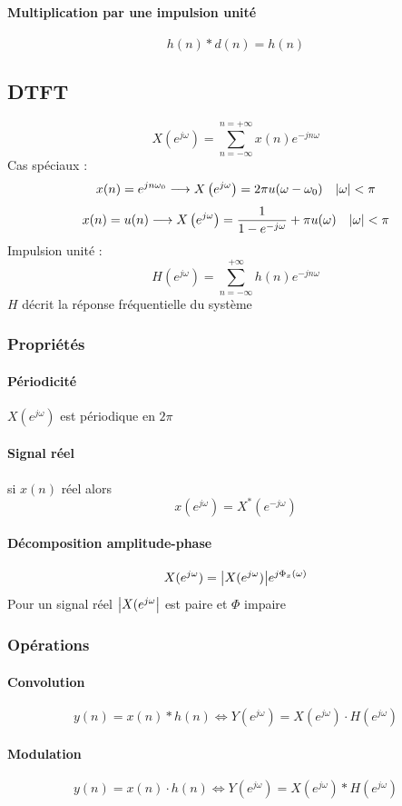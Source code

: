 \documentclass[resume]{subfiles}
\begin{document}
\paragraph{Multiplication par une impulsion unité}
$$h(n)*d(n)=h(n)$$
\subsection{DTFT}
$$\boxed{X\left(e^{j\omega}\right)=\sum_{n=-\infty}^{n=+\infty}x(n)e^{-jn\omega}}$$
Cas spéciaux :
$$x(n)=e^{jn\omega_0}\longrightarrow X\left(e^{j\omega}\right)=2\pi u(\omega-\omega_0)\quad \abs{\omega}<\pi$$
$$x(n)=u(n)\longrightarrow X\left(e^{j\omega}\right)=\frac{1}{1-e^{-j\omega}}+\pi u(\omega)\quad \abs{\omega}<\pi$$
Impulsion unité :
$$H(e^{j\omega})=\sum_{n=-\infty}^{+\infty}h(n)e^{-jn\omega}$$
$H$ décrit la réponse fréquentielle du système
\subsubsection{Propriétés}
\paragraph{Périodicité} $X(e^{j\omega})$ est périodique en $2\pi$
\paragraph{Signal réel} si $x(n)$ réel alors
$$x(e^{j\omega})=X^\ast\left(e^{-j\omega}\right)$$
\paragraph{Décomposition amplitude-phase}
$$X(e^{j\omega})=\abs{X(e^{j\omega})}e^{j\Phi_x(\omega)}$$
Pour un signal réel $\abs{X(e^{j\omega}}$ est paire et $\Phi$ impaire
\subsubsection{Opérations}
\paragraph{Convolution}
$$y(n)=x(n)*h(n)\Longleftrightarrow Y(e^{j\omega})=X(e^{j\omega})\cdot H(e^{j\omega})$$
\paragraph{Modulation}
$$y(n)=x(n)\cdot h(n)\Longleftrightarrow Y(e^{j\omega})=X(e^{j\omega})*H(e^{j\omega})$$
\end{document}
